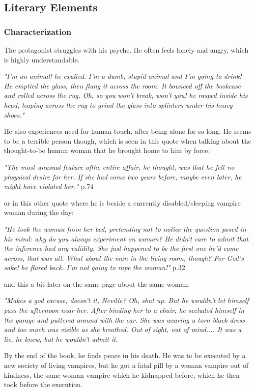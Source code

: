 \subsection{Literary Elements}

\subsubsection{Characterization}

The protagonist struggles with his psyche. He often feels lonely and angry, which is highly understandable.

\textit{"I'm an animal! he exulted. I'm a dumb, stupid animal and I'm going to drink! He emptied the glass, then flung it across the room. It bounced off the bookcase and rolled across the rug. Oh, so you won't break, won't you! he rasped inside his head, leaping across the rug to grind the glass into splinters under his heavy shoes."}

He also experiences need for human touch, after being alone for so long. He seems to be a terrible person though, which is seen in this quote when talking about the thought-to-be human woman that he brought home to him by force:

\textit{"The most unusual feature ofthe entire affair, he thought, was that he felt no phsysical desire for her. If she had come two years before, maybe even later, he might have violated her."} p.74

or in this other quote where he is beside a currently disabled/sleeping vampire woman during the day:

\textit{"He took the woman from her bed, pretending not to notice the question posed in his mind: why do you always experiment on women? He didn't care to admit that the inference had any validity. She just happened to be the first one he'd come across, that was all. What about the man in the living room, though? For God's sake! he flared back. I'm not going to rape the woman!"} p.32

and this a bit later on the same page about the same woman:

\textit{"Makes a god excuse, doesn't it, Neville? Oh, shut up. But he wouldn't let himself pass the afternoon near her. After binding her to a chair, he secluded himself in the garage and puttered around with the car. She was wearing a torn black dress and too much was visible as she breathed. Out of sight, out of mind.... It was a lie, he knew, but he wouldn't admit it.}

By the end of the book, he finds peace in his death. He was to be executed by a new society of living vampires, but he got a fatal pill by a woman vampire out of kindness, the same woman vampire which he kidnapped before, which he then took before the execution.

